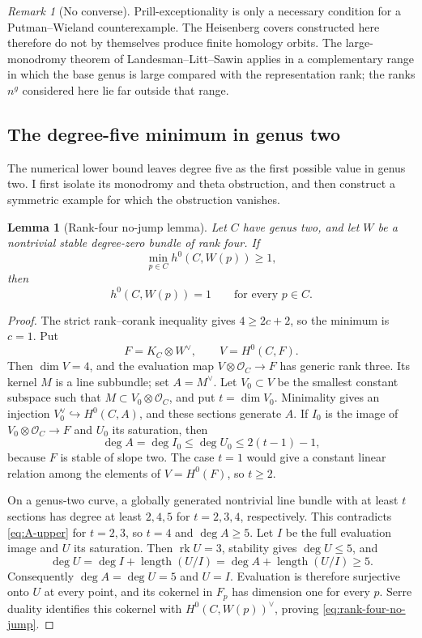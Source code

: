 \documentclass[11pt,reqno]{amsart}
\numberwithin{equation}{section}
\newtheorem{lemma}[lemma]{Lemma}
\theoremstyle{remark}
\newtheorem{remark}[remark]{Remark}
\DeclareMathOperator{\rk}{rk}
\newcommand{\cO}{\mathcal O}
\begin{document}
\begin{remark}[No converse]\label{rem:no-PW-converse}
Prill-exceptionality is only a necessary condition for a
Putman--Wieland counterexample.  The Heisenberg covers constructed here
therefore do not by themselves produce finite homology orbits.  The
large-monodromy theorem of Landesman--Litt--Sawin
\cite{LandesmanLittSawin} applies in a complementary range in which the
base genus is large compared with the representation rank; the ranks
\(n^g\) considered here lie far outside that range.
\end{remark}

\subsection{The degree-five minimum in genus two}

The numerical lower bound leaves degree five as the first possible
value in genus two.  I first isolate its monodromy and theta
obstruction, and then construct a symmetric example for which the
obstruction vanishes.

\begin{lemma}[Rank-four no-jump lemma]\label{lem:rank-four-no-jump}
Let \(C\) have genus two, and let \(W\) be a nontrivial stable
degree-zero bundle of rank four.  If
\[
 \min_{p\in C}h^0(C,W(p))\geq1,
\]
then
\[
 h^0(C,W(p))=1\qquad\text{for every }p\in C.
\tag{6.17}\label{eq:rank-four-no-jump}
\]
\end{lemma}

\begin{proof}
The strict rank--corank inequality gives
\(4\geq2c+2\), so the minimum is \(c=1\).  Put
\[
 F=K_C\otimes W^\vee,\qquad V=H^0(C,F).
\]
Then \(\dim V=4\), and the evaluation map
\(V\otimes\cO_C\to F\) has generic rank three.  Its kernel \(M\) is a
line subbundle; set \(A=M^\vee\).  Let \(V_0\subset V\) be the smallest
constant subspace such that
\(M\subset V_0\otimes\cO_C\), and put \(t=\dim V_0\).  Minimality gives
an injection \(V_0^\vee\hookrightarrow H^0(C,A)\), and these sections
generate \(A\).  If \(I_0\) is the image of
\(V_0\otimes\cO_C\to F\) and \(U_0\) its saturation, then
\[
 \deg A=\deg I_0\leq\deg U_0\leq2(t-1)-1,
\tag{6.18}\label{eq:A-upper}
\]
because \(F\) is stable of slope two.  The case \(t=1\) would give a
constant linear relation among the elements of \(V=H^0(F)\), so
\(t\geq2\).

On a genus-two curve, a globally generated nontrivial line bundle with
at least \(t\) sections has degree at least \(2,4,5\) for
\(t=2,3,4\), respectively.  This contradicts
\eqref{eq:A-upper} for \(t=2,3\), so \(t=4\) and \(\deg A\geq5\).
Let \(I\) be the full evaluation image and \(U\) its saturation.  Then
\(\rk U=3\), stability gives \(\deg U\leq5\), and
\[
 \deg U=\deg I+\operatorname{length}(U/I)
       =\deg A+\operatorname{length}(U/I)\geq5.
\]
Consequently \(\deg A=\deg U=5\) and \(U=I\).  Evaluation is therefore
surjective onto \(U\) at every point, and its cokernel in \(F_p\) has
dimension one for every \(p\).  Serre duality identifies this cokernel
with \(H^0(C,W(p))^\vee\), proving
\eqref{eq:rank-four-no-jump}.
\end{proof}
\end{document}
